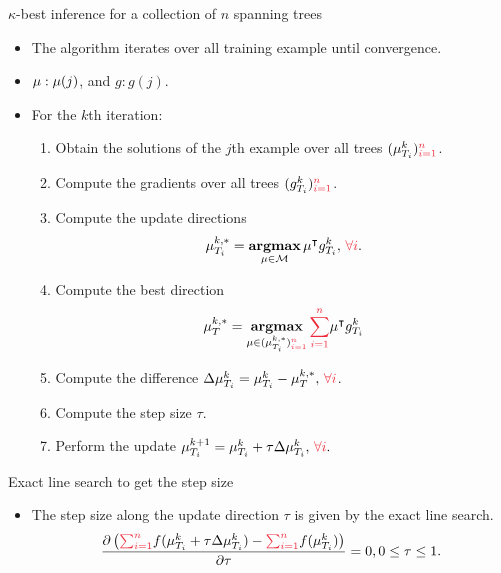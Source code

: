 \documentclass[first=dgreen,second=purple,logo=yellowexc]{aaltoslides}
\begin{document}
\begin{frame}{$\kappa$-best inference for a collection of $n$ spanning trees}
	\begin{itemize}\footnotesize
		\item The algorithm iterates over all training example until convergence.
		\item $\mathbf {\mu}:\mathbf {\mu}(j)$, and $g:g(j)$.
		\item For the $k$th iteration:
		\begin{enumerate}\footnotesize
			\item Obtain the solutions of the $j$th example over all trees $(\vmu_{T_i}^k){\color{aaltored}_{i=1}^n}$.
			\item Compute the gradients over all trees $(g_{T_i}^k){\color{aaltored}_{i=1}^n}$.
			\item Compute the update directions
			\begin{align*}
				{\vmu}_{T_i}^{k,*} = \underset{\vmu\in\Mcal}{\argmax}\,\vmu\tp g_{T_i}^k,\,{\color{aaltored}\forall i}.
			\end{align*}
			\item Compute the best direction
			\begin{align*}
				{\vmu}_{T}^{k,*} = \underset{\vmu\in({\vmu}_{T_i}^{k,*}){\color{aaltored}_{i=1}^n}}{\argmax}\,{\color{aaltored}\sum_{i=1}^n}\vmu\tp g_{T_i}^k
			\end{align*}
			\item Compute the difference $\Delta\vmu_{T_i}^{k} = {\vmu}_{T_i}^{k} - {\vmu}_{T}^{k,*},\,{\color{aaltored}\forall i}$.
			\item Compute the step size $\tau$.
			\item Perform the update $\vmu_{T_i}^{k+1} = \vmu_{T_i}^k + \tau\Delta\vmu_{T_i}^{k},\,{\color{aaltored}\forall i}.$
		\end{enumerate}
	\end{itemize}
\end{frame}

\begin{frame}{Exact line search to get the step size}
	\begin{itemize}
		\item The step size along the update direction $\tau$ is given by the exact line search.
		\begin{align*}\footnotesize
			\frac{\partial \left({\color{aaltored}\sum_{i=1}^n}f(\vmu_{T_i}^k + \tau\Delta\vmu_{T_i}^{k})-{\color{aaltored}\sum_{i=1}^n}f(\vmu_{T_i}^k)\right)}{\partial \tau} = 0, 0\le\tau\le1.
		\end{align*}
	\end{itemize}
\end{frame}
\end{document}
